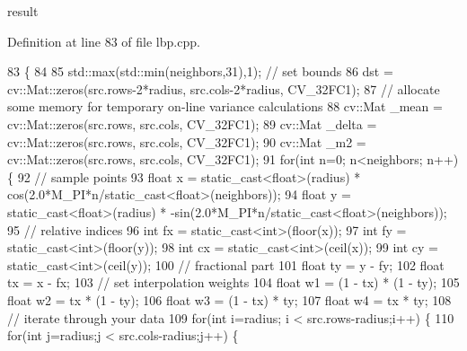 result 

Definition at line 83 of file lbp.\+cpp.


\begin{DoxyCode}
83                                                                          \{
84     
85     std::max(std::min(neighbors,31),1); \textcolor{comment}{// set bounds}
86     dst = cv::Mat::zeros(src.rows-2*radius, src.cols-2*radius, CV\_32FC1); 
87     \textcolor{comment}{// allocate some memory for temporary on-line variance calculations}
88     cv::Mat \_mean = cv::Mat::zeros(src.rows, src.cols, CV\_32FC1);
89     cv::Mat \_delta = cv::Mat::zeros(src.rows, src.cols, CV\_32FC1);
90     cv::Mat \_m2 = cv::Mat::zeros(src.rows, src.cols, CV\_32FC1);
91     \textcolor{keywordflow}{for}(\textcolor{keywordtype}{int} n=0; n<neighbors; n++) \{
92         \textcolor{comment}{// sample points}
93         \textcolor{keywordtype}{float} x = \textcolor{keyword}{static\_cast<}\textcolor{keywordtype}{float}\textcolor{keyword}{>}(radius) * cos(2.0*M\_PI*n/static\_cast<float>(neighbors));
94         \textcolor{keywordtype}{float} y = \textcolor{keyword}{static\_cast<}\textcolor{keywordtype}{float}\textcolor{keyword}{>}(radius) * -sin(2.0*M\_PI*n/static\_cast<float>(neighbors));
95         \textcolor{comment}{// relative indices}
96         \textcolor{keywordtype}{int} fx = \textcolor{keyword}{static\_cast<}\textcolor{keywordtype}{int}\textcolor{keyword}{>}(floor(x));
97         \textcolor{keywordtype}{int} fy = \textcolor{keyword}{static\_cast<}\textcolor{keywordtype}{int}\textcolor{keyword}{>}(floor(y));
98         \textcolor{keywordtype}{int} cx = \textcolor{keyword}{static\_cast<}\textcolor{keywordtype}{int}\textcolor{keyword}{>}(ceil(x));
99         \textcolor{keywordtype}{int} cy = \textcolor{keyword}{static\_cast<}\textcolor{keywordtype}{int}\textcolor{keyword}{>}(ceil(y));
100         \textcolor{comment}{// fractional part}
101         \textcolor{keywordtype}{float} ty = y - fy;
102         \textcolor{keywordtype}{float} tx = x - fx;
103         \textcolor{comment}{// set interpolation weights}
104         \textcolor{keywordtype}{float} w1 = (1 - tx) * (1 - ty);
105         \textcolor{keywordtype}{float} w2 =      tx  * (1 - ty);
106         \textcolor{keywordtype}{float} w3 = (1 - tx) *      ty;
107         \textcolor{keywordtype}{float} w4 =      tx  *      ty;
108         \textcolor{comment}{// iterate through your data}
109         \textcolor{keywordflow}{for}(\textcolor{keywordtype}{int} i=radius; i < src.rows-radius;i++) \{
110             \textcolor{keywordflow}{for}(\textcolor{keywordtype}{int} j=radius;j < src.cols-radius;j++) \{

\end{DoxyCode}

